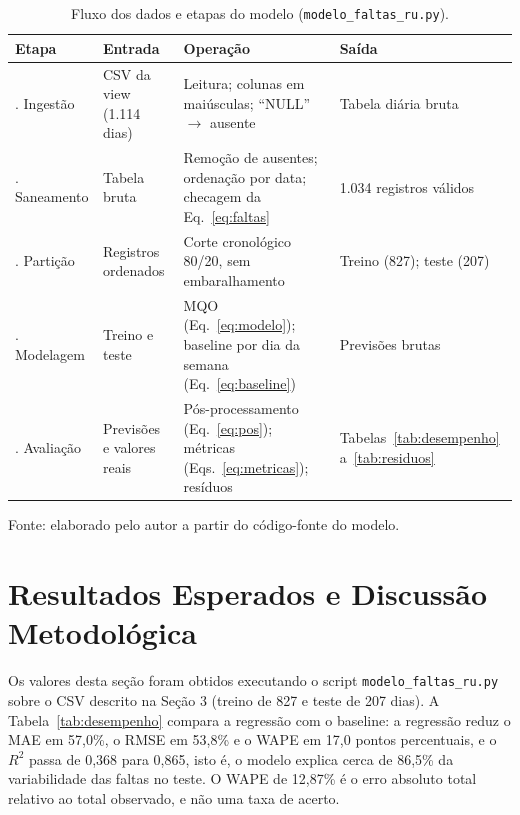 \documentclass[11pt]{article}
\begin{document}
\begin{table}[htbp]
\centering
\small
\caption{Fluxo dos dados e etapas do modelo (\texttt{modelo\_faltas\_ru.py}).}
\label{tab:fluxo}
\begin{tabularx}{\textwidth}{@{}>{\raggedright\arraybackslash}p{}>{\raggedright\arraybackslash}p{}XX@{}}
\toprule
Etapa & Entrada & Operação & Saída \\
\midrule
1. Ingestão & CSV da view (1.114 dias) & Leitura; colunas em maiúsculas; ``NULL'' $\to$ ausente & Tabela diária bruta \\
2. Saneamento & Tabela bruta & Remoção de ausentes; ordenação por data; checagem da Eq.~\ref{eq:faltas} & 1.034 registros válidos \\
3. Partição & Registros ordenados & Corte cronológico 80/20, sem embaralhamento & Treino (827); teste (207) \\
4. Modelagem & Treino e teste & MQO (Eq.~\ref{eq:modelo}); baseline por dia da semana (Eq.~\ref{eq:baseline}) & Previsões brutas \\
5. Avaliação & Previsões e valores reais & Pós-processamento (Eq.~\ref{eq:pos}); métricas (Eqs.~\ref{eq:metricas}); resíduos & Tabelas~\ref{tab:desempenho} a~\ref{tab:residuos} \\
\bottomrule
\end{tabularx}
\begin{flushleft}\footnotesize Fonte: elaborado pelo autor a partir do código-fonte do modelo.\end{flushleft}
\end{table}

\section{Resultados Esperados e Discussão Metodológica}

Os valores desta seção foram obtidos executando o script \texttt{modelo\_faltas\_ru.py} sobre o CSV descrito na Seção 3 (treino de 827 e teste de 207 dias). A Tabela~\ref{tab:desempenho} compara a regressão com o baseline: a regressão reduz o MAE em 57,0\%, o RMSE em 53,8\% e o WAPE em 17,0 pontos percentuais, e o $R^2$ passa de 0,368 para 0,865, isto é, o modelo explica cerca de 86,5\% da variabilidade das faltas no teste. O WAPE de 12,87\% é o erro absoluto total relativo ao total observado, e não uma taxa de acerto.
\end{document}

